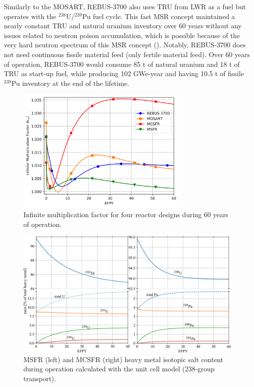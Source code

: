 \documentclass[letterpaper]{mandc2019}
\begin{document}
Similarly to the \gls{MOSART}, REBUS-3700 also uses TRU from \gls{LWR} as a fuel but operates with the $^{238}$U/$^{239}$Pu fuel cycle. 
This fast \gls{MSR} concept maintained a nearly constant TRU and natural uranium inventory over 60 years without any issues related to neutron poison accumulation, which is possible because of the very hard neutron spectrum of this \gls{MSR} concept (). 
Notably, REBUS-3700 does not need continuous fissile material feed (only fertile material feed). 
Over 60 years of operation, REBUS-3700 would consume 85 t of natural uranium and 18 t of TRU as start-up fuel, while producing 102 GWe-year and having 10.5 t of fissile $^{239}$Pu inventory at the end of the lifetime. 
\begin{figure}[t!]
  \centering
  \vspace{-0.3in}
  \includegraphics[width=0.75\textwidth]{./Figures/k_inf.png}
	  \vspace{-0.15in}
  \caption{Infinite multiplication factor for four reactor designs during 60 years of operation.}
  \label{fig:k_inf}
  \vspace{-0.4in}
\end{figure}
\begin{figure}[t!]
  \centering
  \includegraphics[width=\textwidth]{./Figures/msfr_mcsfr_balance.png}
	  \vspace{-0.2in}
  \caption{\gls{MSFR} (left) and \gls{MCSFR} (right) heavy metal isotopic salt content during operation calculated with the unit cell model (238-group transport).}
  \label{fig:msfr-u-balance}
      \vspace{-0.2in}
\end{figure}
\end{document}
